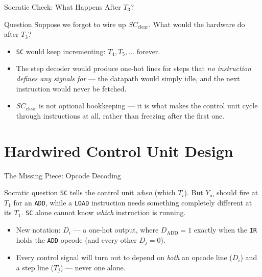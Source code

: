 \documentclass[aspectratio=169]{beamer}
\begin{document}
\begin{frame}{Socratic Check: What Happens After $T_3$?}
  \begin{alertblock}{Question}
    Suppose we forgot to wire up $SC_{\text{clear}}$. What would the hardware do after
    $T_3$?
  \end{alertblock}
  \begin{itemize}
    \item \texttt{SC} would keep incrementing: $T_4, T_5, \dots$ forever.
    \item The step decoder would produce one-hot lines for steps that
      \emph{no instruction defines any signals for} --- the datapath would simply
      idle, and the next instruction would never be fetched.
    \item $SC_{\text{clear}}$ is not optional bookkeeping --- it is what makes the control
      unit cycle through instructions at all, rather than freezing after the first
      one.
  \end{itemize}
\end{frame}


\section{Hardwired Control Unit Design}

\begin{frame}{The Missing Piece: Opcode Decoding}
  \begin{block}{Socratic question}
    \texttt{SC} tells the control unit \emph{when} (which $T_i$). But
    $Y_{\text{in}}$ should fire at $T_1$ for an \texttt{ADD}, while a \texttt{LOAD}
    instruction needs something completely different at its $T_1$. \texttt{SC}
    alone cannot know \emph{which} instruction is running.
  \end{block}
  \begin{itemize}
    \item New notation: $D_i$ --- a one-hot  output, where
      $D_{\text{ADD}} = 1$ exactly when the \texttt{IR} holds the \texttt{ADD}
      opcode (and every other $D_j = 0$).
    \item Every control signal will turn out to depend on \emph{both} an opcode
      line ($D_i$) and a step line ($T_j$) --- never one alone.
  \end{itemize}
\end{frame}
\end{document}
